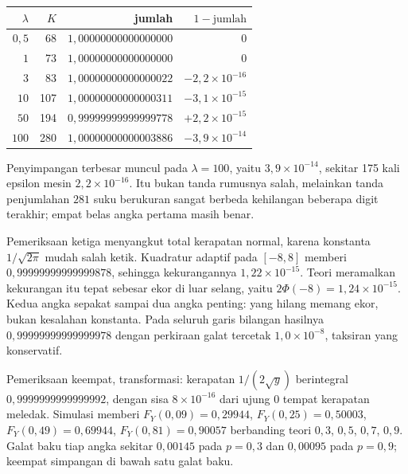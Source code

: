 \begin{center}\small
\begin{tabular}{rrrr}
\hline
$\lambda$ & $K$ & jumlah & $1-\text{jumlah}$ \\
\hline
$0{,}5$ & 68 & $1{,}00000000000000000$ & $0$ \\
$1$ & 73 & $1{,}00000000000000000$ & $0$ \\
$3$ & 83 & $1{,}00000000000000022$ & $-2{,}2\times10^{-16}$ \\
$10$ & 107 & $1{,}00000000000000311$ & $-3{,}1\times10^{-15}$ \\
$50$ & 194 & $0{,}99999999999999778$ & $+2{,}2\times10^{-15}$ \\
$100$ & 280 & $1{,}00000000000003886$ & $-3{,}9\times10^{-14}$ \\
\hline
\end{tabular}
\end{center}

Penyimpangan terbesar muncul pada $\lambda=100$, yaitu $3{,}9\times10^{-14}$, sekitar
175 kali epsilon mesin $2{,}2\times10^{-16}$. Itu bukan tanda rumusnya salah, melainkan
tanda penjumlahan $281$ suku berukuran sangat berbeda kehilangan beberapa digit
terakhir; empat belas angka pertama masih benar.

Pemeriksaan ketiga menyangkut total kerapatan normal, karena konstanta
$1/\sqrt{2\pi}$ mudah salah ketik. Kuadratur adaptif pada $[-8,8]$ memberi
$0{,}99999999999999878$, sehingga kekurangannya $1{,}22\times10^{-15}$. Teori
meramalkan kekurangan itu tepat sebesar ekor di luar selang, yaitu
$2\Phi(-8)=1{,}24\times10^{-15}$. Kedua angka sepakat sampai dua angka penting: yang
hilang memang ekor, bukan kesalahan konstanta. Pada seluruh garis bilangan hasilnya
$0{,}99999999999999978$ dengan perkiraan galat tercetak $1{,}0\times10^{-8}$, taksiran
yang konservatif.

Pemeriksaan keempat, transformasi: kerapatan $1/(2\sqrt y)$ berintegral
$0{,}9999999999999992$, dengan sisa $8\times10^{-16}$ dari ujung $0$ tempat kerapatan
meledak. Simulasi memberi $F_Y(0{,}09)=0{,}29944$, $F_Y(0{,}25)=0{,}50003$,
$F_Y(0{,}49)=0{,}69944$, $F_Y(0{,}81)=0{,}90057$ berbanding teori $0{,}3$, $0{,}5$,
$0{,}7$, $0{,}9$. Galat baku tiap angka sekitar $0{,}00145$ pada $p=0{,}3$ dan
$0{,}00095$ pada $p=0{,}9$; keempat simpangan di bawah satu galat baku.


